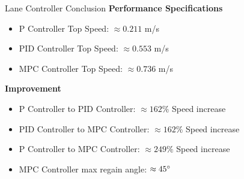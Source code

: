 \documentclass[aspectratio=169,12pt]{beamer}
\begin{document}
\begin{frame}[t]{Lane Controller Conclusion}
  \textbf{Performance Specifications}
  \begin{itemize}
      \item P Controller Top Speed: \(\approx0.211\) m/s
      \item PID Controller Top Speed: \(\approx0.553\) m/s
      \item MPC Controller Top Speed: \(\approx0.736\) m/s
      
  \end{itemize}
  \textbf{Improvement}
  \begin{itemize}
      \item P Controller to PID Controller: \(\approx 162 \%\) Speed increase
      \item PID Controller to MPC Controller: \(\approx 162 \%\) Speed increase
      \item P Controller to MPC Controller: \(\approx 249 \%\) Speed increase
      \item MPC Controller max regain angle: \(\approx 45 \degree\)
      
  \end{itemize}
\end{frame}
\end{document}
